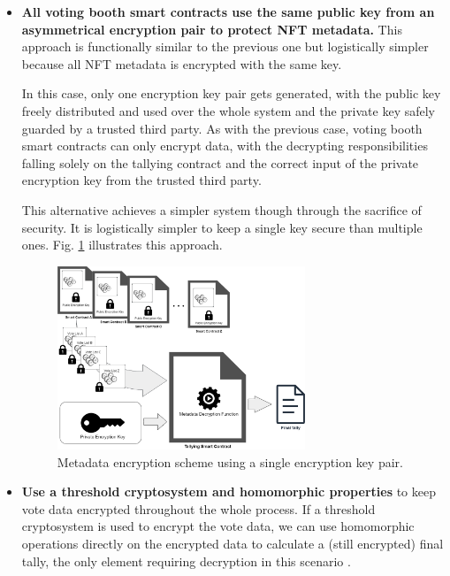 \documentclass[../main.tex]{subfiles}
\begin{document}
\begin{itemize}
    \item{\textbf{All voting booth smart contracts use the same public key from an asymmetrical encryption pair to protect NFT metadata.} This approach is functionally similar to the previous one but logistically simpler because all NFT metadata is encrypted with the same key.
          \par
          In this case, only one encryption key pair gets generated, with the public key freely distributed and used over the whole system and the private key safely guarded by a trusted third party. As with the previous case, voting booth smart contracts can only encrypt data, with the decrypting responsibilities falling solely on the tallying contract and the correct input of the private encryption key from the trusted third party.
          \par
          This alternative achieves a simpler system though through the sacrifice of security. It is logistically simpler to keep a single key secure than multiple ones. Fig. \ref{fig:single_encryption_key_scheme} illustrates this approach.}

          \begin{figure}[htp]
              \centering
              \includegraphics[width=0.7\textwidth]{../Images/ContractBasedSolution_encryption_single_key.png}
              \caption{Metadata encryption scheme using a single encryption key pair.}
              \label{fig:single_encryption_key_scheme}
          \end{figure}

    \item{\textbf{Use a threshold cryptosystem and homomorphic properties} to keep vote data encrypted throughout the whole process. If a threshold cryptosystem is used to encrypt the vote data, we can use homomorphic operations directly on the encrypted data to calculate a (still encrypted) final tally, the only element requiring decryption in this scenario \cite{Benaloh1986b} \cite{Rjaskova2002}.}


\end{itemize}
\end{document}

